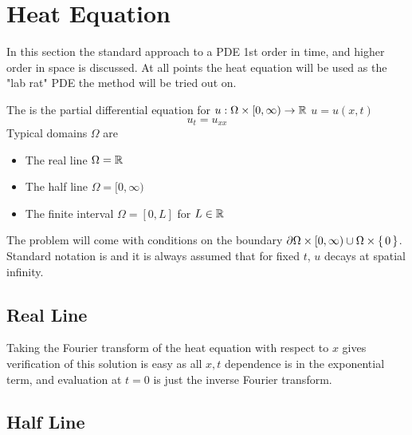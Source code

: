 \documentclass{article}
\begin{document}
\section{Heat Equation}
In this section the standard approach to a PDE 1st order in time, and higher order in space is discussed. At all points the heat equation will be used as the "lab rat" PDE the method will be tried out on. \\
\begin{definition}
The  is the partial differential equation for $u:\Omega \times [0,\infty) \to \mathbb{R}$ $u=u(x,t)$
\[
u_t = u_{xx}
\]
Typical domains $\Omega$ are 
\begin{itemize}
    \item The real line $\Omega = \mathbb{R}$
    \item The half line $\Omega = [0,\infty)$
    \item The finite interval $\Omega = [0,L]$ for $L\in\mathbb{R}$
\end{itemize}
The problem will come with conditions on the boundary $\partial \Omega \times [0,\infty) \cup \Omega\times \set{0}$. Standard notation is 
and it is always assumed that for fixed $t$, $u$ decays at spatial infinity.
\end{definition}

\subsection{Real Line}
Taking the Fourier transform of the heat equation with respect to $x$ gives 
verification of this solution is easy as all $x,t$ dependence is in the exponential term, and evaluation at $t=0$ is just the inverse Fourier transform. 
\subsection{Half Line}
\end{document}
